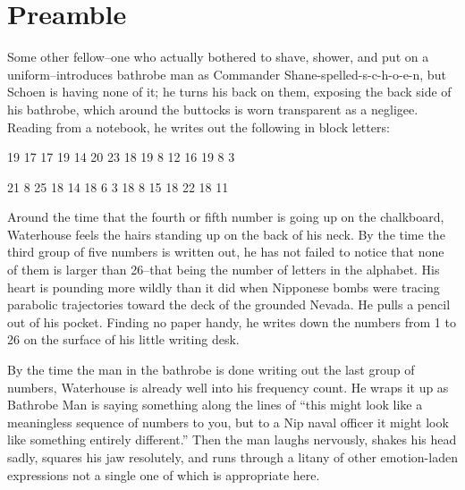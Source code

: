 \documentclass{42-en}
\begin{document}
\chapter{Preamble}

Some other fellow--one who actually bothered to shave, shower, and put on a uniform--introduces bathrobe man as Commander Shane-spelled-s-c-h-o-e-n, but Schoen is having none of it; he turns his back on them, exposing the back side of his bathrobe, which around the buttocks is worn transparent as a negligee. Reading from a notebook, he writes out the following in block letters:

19 17 17 19 14 20 23 18 19 8 12 16 19 8 3

21 8 25 18 14 18 6 3 18 8 15 18 22 18 11

Around the time that the fourth or fifth number is going up on the chalkboard, Waterhouse feels the hairs standing up on the back of his neck. By the time the third group of five numbers is written out, he has not failed to notice that none of them is larger than 26--that being the number of letters in the alphabet. His heart is pounding more wildly than it did when Nipponese bombs were tracing parabolic trajectories toward the deck of the grounded Nevada. He pulls a pencil out of his pocket. Finding no paper handy, he writes down the numbers from 1 to 26 on the surface of his little writing desk.

By the time the man in the bathrobe is done writing out the last group of numbers, Waterhouse is already well into his frequency count. He wraps it up as Bathrobe Man is saying something along the lines of ``this might look like a meaningless sequence of numbers to you, but to a Nip naval officer it might look like something entirely different.'' Then the man laughs nervously, shakes his head sadly, squares his jaw resolutely, and runs through a litany of other emotion-laden expressions not a single one of which is appropriate here.
\end{document}
